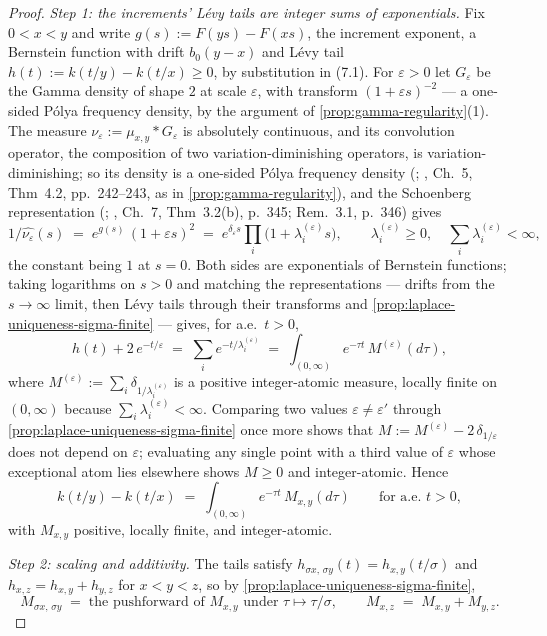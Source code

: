 \begin{proof}
\emph{Step 1: the increments' L\'evy tails are integer sums of exponentials.} Fix
$0 < x < y$ and write $g(s) := F(ys) - F(xs)$, the increment exponent, a Bernstein
function with drift $b_0(y - x)$ and L\'evy tail
$h(t) := k(t/y) - k(t/x) \ge 0$, by substitution in (7.1). For $\varepsilon > 0$ let
$G_\varepsilon$ be the Gamma density of shape $2$ at scale $\varepsilon$, with transform
$(1 + \varepsilon s)^{-2}$ --- a one-sided P\'olya frequency density, by the argument of
\ref{prop:gamma-regularity}(1). The measure
$\nu_\varepsilon := \mu_{x,y} * G_\varepsilon$ is absolutely continuous, and its
convolution operator, the composition of two variation-diminishing operators, is
variation-diminishing; so its density is a one-sided P\'olya frequency density
(; , Ch.~5, Thm~4.2, pp.~242--243, as in
\ref{prop:gamma-regularity}), and the Schoenberg representation
(; , Ch.~7, Thm~3.2(b), p.~345; Rem.~3.1, p.~346) gives
\[
  1/\widehat{\nu_\varepsilon}(s) \;=\; e^{g(s)}\,(1 + \varepsilon s)^{2}
  \;=\; e^{\delta_\varepsilon s} \prod_i \bigl(1 + \lambda^{(\varepsilon)}_i s\bigr),
  \qquad \lambda^{(\varepsilon)}_i \ge 0, \quad
  \textstyle\sum_i \lambda^{(\varepsilon)}_i < \infty,
\]
the constant being $1$ at $s = 0$. Both sides are exponentials of Bernstein functions;
taking logarithms on $s > 0$ and matching the representations --- drifts from the
$s \to \infty$ limit, then L\'evy tails through their transforms and
\ref{prop:laplace-uniqueness-sigma-finite} --- gives, for a.e.\ $t > 0$,
\[
  h(t) + 2\,e^{-t/\varepsilon} \;=\; \sum_i e^{-t/\lambda^{(\varepsilon)}_i}
  \;=\; \int_{(0,\infty)} e^{-\tau t}\, M^{(\varepsilon)}(d\tau),
\]
where $M^{(\varepsilon)} := \sum_i \delta_{1/\lambda^{(\varepsilon)}_i}$ is a positive
integer-atomic measure, locally finite on $(0,\infty)$ because
$\sum_i \lambda^{(\varepsilon)}_i < \infty$. Comparing two values
$\varepsilon \ne \varepsilon'$ through
\ref{prop:laplace-uniqueness-sigma-finite} once more shows that
$M := M^{(\varepsilon)} - 2\,\delta_{1/\varepsilon}$ does not depend on $\varepsilon$;
evaluating any single point with a third value of $\varepsilon$ whose exceptional atom
lies elsewhere shows $M \ge 0$ and integer-atomic. Hence
\[
  k(t/y) - k(t/x) \;=\; \int_{(0,\infty)} e^{-\tau t}\, M_{x,y}(d\tau)
  \qquad \text{for a.e.\ } t > 0,
\]
with $M_{x,y}$ positive, locally finite, and integer-atomic.

\emph{Step 2: scaling and additivity.} The tails satisfy
$h_{\sigma x,\, \sigma y}(t) = h_{x,y}(t/\sigma)$ and $h_{x,z} = h_{x,y} + h_{y,z}$ for
$x < y < z$, so by \ref{prop:laplace-uniqueness-sigma-finite},
\[
  M_{\sigma x,\, \sigma y} \;=\; \text{the pushforward of } M_{x,y}
  \text{ under } \tau \mapsto \tau/\sigma,
  \qquad
  M_{x,z} \;=\; M_{x,y} + M_{y,z}.
\]


\end{proof}
